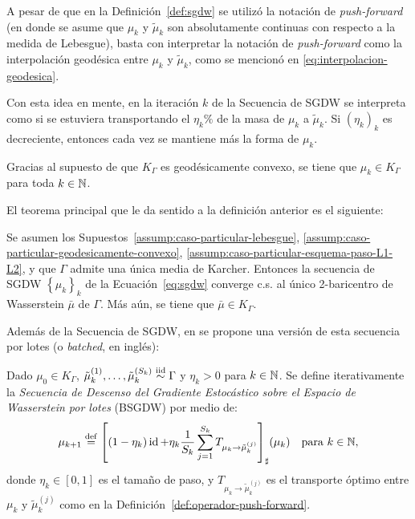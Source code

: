 \begin{remark}
    A pesar de que en la Definición~\ref{def:sgdw} se utilizó la notación de \textit{push-forward} (en donde se asume que $\mu_k$ y $\tilde \mu_k$ son absolutamente continuas con respecto a la medida de Lebesgue), basta con interpretar la notación de \textit{push-forward} como la interpolación geodésica entre $\mu_k$ y $\tilde \mu_k$, como se mencionó en \eqref{eq:interpolacion-geodesica}.

    Con esta idea en mente, en la iteración $k$ de la Secuencia de SGDW se interpreta como si se estuviera transportando el $\eta_k\%$ de la masa de $\mu_k$ a $\tilde \mu_k$. Si $(\eta_k)_k$ es decreciente, entonces cada vez se mantiene más la forma de $\mu_k$.
\end{remark}

\begin{remark}
    Gracias al supuesto de que $K_\Gamma$ es geodésicamente convexo, se tiene que $\mu_k \in K_\Gamma$ para toda $k \in\mathbb{N}$.
\end{remark}

El teorema principal que le da sentido a la definición anterior es el siguiente:

\begin{theorem}\label{thm:convergencia-sgdw}
    Se asumen los Supuestos~\ref{assump:caso-particular-lebesgue}, \ref{assump:caso-particular-geodesicamente-convexo}, \ref{assump:caso-particular-esquema-paso-L1-L2}, y que $\Gamma$ admite una única media de Karcher. Entonces la secuencia de SGDW $\left\{ \mu_k \right\}_k$ de la Ecuación~\eqref{eq:sgdw} converge c.s. al único 2-baricentro de Wasserstein $\bar \mu$ de $\Gamma$. Más aún, se tiene que $\bar \mu\in K_\Gamma$.
\end{theorem}

Además de la Secuencia de SGDW, en \cite{backhoff2022stochastic} se propone una versión de esta secuencia por lotes (o \textit{batched}, en inglés):

\begin{definition}\label{def:bsgdw}
    Dado $\mu_0 \in K_\Gamma$, $\tilde \mu_k^{(1)}, \ldots, \tilde \mu_k^{(S_k)} \stackrel{\mathrm{iid}}{\sim} \Gamma$ y $\eta_k > 0$ para $k \in\mathbb{N}$. Se define iterativamente la \textit{Secuencia de Descenso del Gradiente Estocástico sobre el Espacio de Wasserstein por lotes} (BSGDW) por medio de:
    \begin{equation}
        \label{eq:bsgdw}
        \mu_{k+1} \stackrel{\mathrm{def}}{=} {\qty[
                (1 - \eta_k) \operatorname{id} + \eta_k \frac{1}{S_k} \sum_{j=1}^{S_k} T_{\mu_k \to \tilde \mu_k^{(j)}}
            ]}_{\sharp} (\mu_k) \quad \text{para } k \in\mathbb{N},
    \end{equation}
    donde $\eta_k \in [0, 1]$ es el tamaño de paso, y $T_{\mu_k \to \tilde \mu_k^{(j)}}$ es el transporte óptimo entre $\mu_k$ y $\tilde \mu_k^{(j)}$ como en la Definición~\ref{def:operador-push-forward}.
\end{definition}

